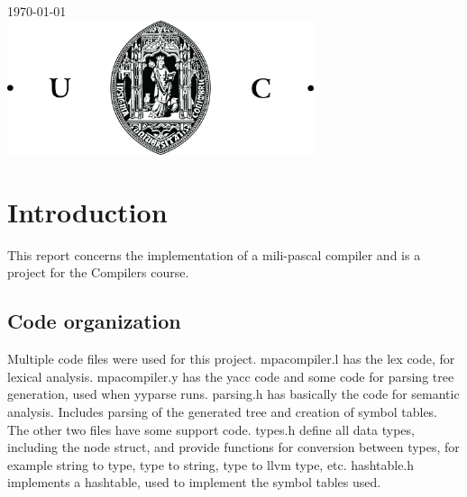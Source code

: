 \documentclass[12pt]{article}
\begin{document}
\begin{titlepage}
{\large \today}\\[2cm] %


\includegraphics [width=9cm]{logo.jpg}\\[1cm] %
 

\vfill %

\end{titlepage}


\section{Introduction}

This report concerns the implementation of a mili-pascal compiler and is a project for the Compilers course.

\subsection{Code organization}

Multiple code files were used for this project. mpacompiler.l has the lex code, for lexical analysis. mpacompiler.y has the yacc code and some code for parsing tree generation, used when yyparse runs. parsing.h has basically the code for semantic analysis. Includes parsing of the generated tree and creation of symbol tables.\\
The other two files have some support code. types.h define all data types, including the node struct, and provide functions for conversion between types, for example string to type, type to string, type to llvm type, etc. hashtable.h implements a hashtable, used to implement the symbol tables used.\\
\end{document}
